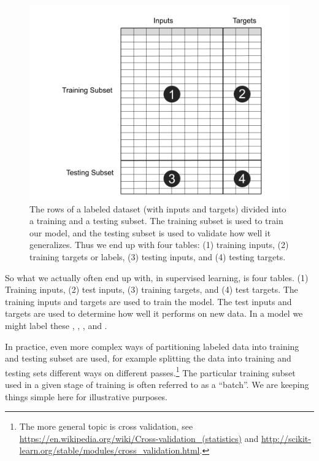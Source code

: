 \begin{figure}[h]
\centering
\includegraphics[scale=0.3]{./images/trainTest2.png}
\caption[Jeff Yoshimi.]{The rows of a labeled dataset (with inputs and targets) divided into a training and a  testing subset. The training subset is used to train our model, and the testing subset is used to validate how well it generalizes. Thus we end up with four tables: (1) training inputs, (2)  training targets or labels, (3) testing inputs, and (4) testing targets. }
\label{trainTest}
\end{figure}

So what we actually often end up with, in supervised learning, is four tables. (1) Training inputs, (2) test inputs, (3) training targets, and (4) test targets. The training inputs and targets are used to train the model. The test inputs and targets are used to determine how well it performs on new data. In a model we might label these , , , and . 

In practice, even more complex ways of partitioning labeled data into training and testing subset are used, for example splitting the data into training and testing sets different ways on different passes.\footnote{The more general topic is cross validation, see \url{https://en.wikipedia.org/wiki/Cross-validation_(statistics)} and \url{http://scikit-learn.org/stable/modules/cross_validation.html}.} The particular training subset used in a given stage of training is often referred to as a ``batch''. We are keeping things simple here for illustrative purposes.
 
